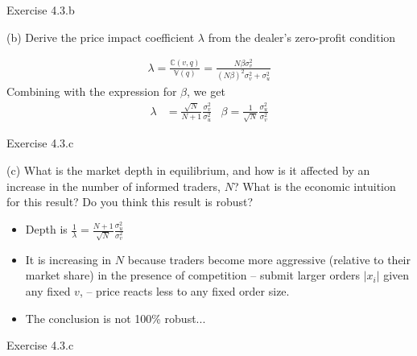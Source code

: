 \documentclass[english,10pt]{beamer}
\begin{document}
\begin{frame}{Exercise 4.3.b}
	\begin{exampleblock}{}
		(b) Derive the price impact coefficient $\lambda$ from the dealer's zero-profit condition
	\end{exampleblock}
	
	\begin{align*}
		\lambda = \frac{\mathbb{C}(v,q)}{\mathbb{V}(q)} = \frac{N \beta \sigma^2_v}{(N \beta)^2 \sigma^2_v + \sigma^2_u}	
	\end{align*}
	Combining with the expression for $\beta$, we get
	\begin{align*}
		\lambda &= \frac{\sqrt{N}}{N+1} \frac{\sigma^2_v}{\sigma^2_u} 
		&
		\beta = \frac{1}{\sqrt{N}} \frac{\sigma^2_u}{\sigma^2_v}
	\end{align*}
\end{frame}


\begin{frame}{Exercise 4.3.c}
	\begin{exampleblock}{}
		(c) What is the market depth in equilibrium, and how is it affected by an increase in the number of informed traders, $N$? What is the economic intuition for this result?
		Do you think this result is robust?
	\end{exampleblock}
	
	\begin{itemize}
		\item Depth is $\frac{1}{\lambda} = \frac{N+1}{\sqrt{N}} \frac{\sigma^2_u}{\sigma^2_v} $
		\item It is increasing in $N$ because traders become more aggressive (relative to their market share) in the presence of competition -- submit larger orders $|x_i|$ given any fixed $v$, -- price reacts less to any fixed order size.
		\item The conclusion is not 100\% robust...
	\end{itemize}
\end{frame}


\begin{frame}{Exercise 4.3.c}
\end{frame}
\end{document}
